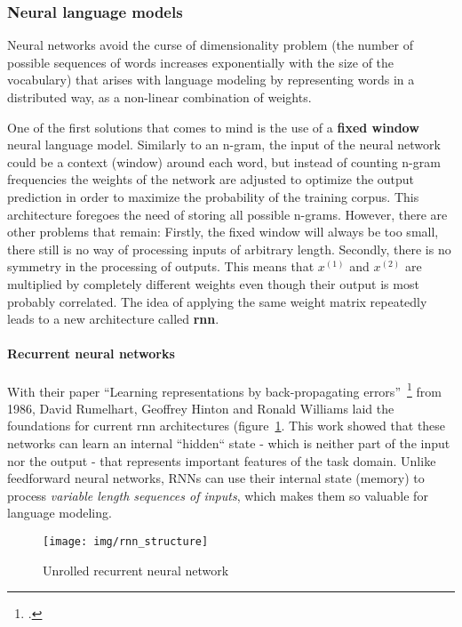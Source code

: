 \subsubsection{Neural language models}
\label{sub:neural_language_models}

Neural networks avoid the curse of dimensionality problem (the number of possible sequences of words increases exponentially with the size of the vocabulary) that arises with language modeling by representing words in a distributed way, as a non-linear combination of weights.

One of the first solutions that comes to mind is the use of a \textbf{fixed window} neural language model. Similarly to an n-gram, the input of the neural network could be a context (window) around each word, but instead of counting n-gram frequencies the weights of the network are adjusted to optimize the output prediction in order to maximize the probability of the training corpus. This architecture foregoes the need of storing all possible n-grams. However, there are other problems that remain: Firstly, the fixed window will always be too small, there still is no way of processing inputs of arbitrary length. Secondly, there is no symmetry in the processing of outputs. This means that $ x^{(1)} $ and $ x^{(2)} $ are multiplied by completely different weights even though their output is most probably correlated. The idea of applying the same weight matrix repeatedly leads to a new architecture called \textbf{\gls{rnn}}.

\paragraph{Recurrent neural networks}
With their paper “Learning representations by back-propagating errors”~\footcite{10.5555/65669.104451} from 1986, David Rumelhart, Geoffrey Hinton and Ronald Williams laid the foundations for current \gls{rnn} architectures (figure~\ref{fig:recurrent_neural_network_architecture}. This work showed that these networks can learn an internal “hidden“ state - which is neither part of the input nor the output - that represents important features of the task domain. Unlike feedforward neural networks, RNNs can use their internal state (memory) to process \textit{variable length sequences of inputs}, which makes them so valuable for language modeling.

\begin{figure}[h]
  	\texttt{[image: img/rnn\_structure]}
  	\caption{Unrolled recurrent neural network}
	\label{fig:recurrent_neural_network_architecture}
\end{figure}

